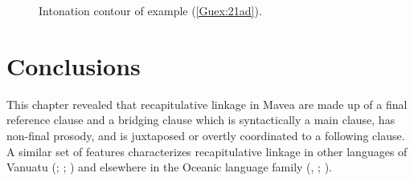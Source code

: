\documentclass[output=paper]{LSP/langsci}
\begin{document}
\begin{figure}[ht]
\caption{Intonation contour of example (\ref{Guex:21ad}). \label{GuF8}}
\end{figure}




\section{Conclusions}
\label{Guconclu}
This chapter  revealed that recapitulative linkage in Mavea are made up of a final reference clause and a bridging clause which is syntactically a main clause, has non-final prosody, and is juxtaposed or overtly coordinated to a following clause. A similar set of features characterizes recapitulative linkage in other languages of Vanuatu (\citealt[][24--26]{Schneider09}; \citealt[][327]{Thieberger06}; \citealt[][426]{hyslop01}) and elsewhere in the Oceanic language family (\citealt{palmer09,Frostad2012}, \citealt[][172]{hamel88}; \citealt[][115--116]{Schokkin14} \citealt[][94]{Lithgow95}). 
\end{document}
